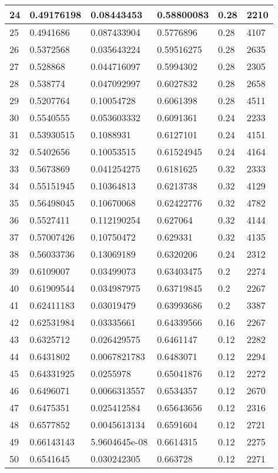 \begin{longtable}{|l|l|l|l|l|l|}
24 & 0.49176198 & 0.08443453 & 0.58800083 & 0.28 & 2210 \\ \hline 
25 & 0.4941686 & 0.087433904 & 0.5776896 & 0.28 & 4107 \\ \hline 
26 & 0.5372568 & 0.035643224 & 0.59516275 & 0.28 & 2635 \\ \hline 
27 & 0.528868 & 0.044716097 & 0.5994302 & 0.28 & 2305 \\ \hline 
28 & 0.538774 & 0.047092997 & 0.6027832 & 0.28 & 2658 \\ \hline 
29 & 0.5207764 & 0.10054728 & 0.6061398 & 0.28 & 4511 \\ \hline 
30 & 0.5540555 & 0.053603332 & 0.6091361 & 0.24 & 2233 \\ \hline 
31 & 0.53930515 & 0.1088931 & 0.6127101 & 0.24 & 4151 \\ \hline 
32 & 0.5402656 & 0.10053515 & 0.61524945 & 0.24 & 4164 \\ \hline 
33 & 0.5673869 & 0.041254275 & 0.6181625 & 0.32 & 2333 \\ \hline 
34 & 0.55151945 & 0.10364813 & 0.6213738 & 0.32 & 4129 \\ \hline 
35 & 0.56498045 & 0.10670068 & 0.62422776 & 0.32 & 4782 \\ \hline 
36 & 0.5527411 & 0.112190254 & 0.627064 & 0.32 & 4144 \\ \hline 
37 & 0.57007426 & 0.10750472 & 0.629331 & 0.32 & 4135 \\ \hline 
38 & 0.56033736 & 0.13069189 & 0.6320206 & 0.24 & 2312 \\ \hline 
39 & 0.6109007 & 0.03499073 & 0.63403475 & 0.2 & 2274 \\ \hline 
40 & 0.61909544 & 0.034987975 & 0.63719845 & 0.2 & 2267 \\ \hline 
41 & 0.62411183 & 0.03019479 & 0.63993686 & 0.2 & 3387 \\ \hline 
42 & 0.62531984 & 0.03335661 & 0.64339566 & 0.16 & 2267 \\ \hline 
43 & 0.6325712 & 0.026429575 & 0.6461147 & 0.12 & 2282 \\ \hline 
44 & 0.6431802 & 0.0067821783 & 0.6483071 & 0.12 & 2294 \\ \hline 
45 & 0.64331925 & 0.0255978 & 0.65041876 & 0.12 & 2272 \\ \hline 
46 & 0.6496071 & 0.0066313557 & 0.6534357 & 0.12 & 2670 \\ \hline 
47 & 0.6475351 & 0.025412584 & 0.65643656 & 0.12 & 2316 \\ \hline 
48 & 0.6577852 & 0.0045613134 & 0.6591604 & 0.12 & 2721 \\ \hline 
49 & 0.66143143 & 5.9604645e-08 & 0.6614315 & 0.12 & 2275 \\ \hline 
50 & 0.6541645 & 0.030242305 & 0.663728 & 0.12 & 2271 \\ \hline 
\end{longtable}